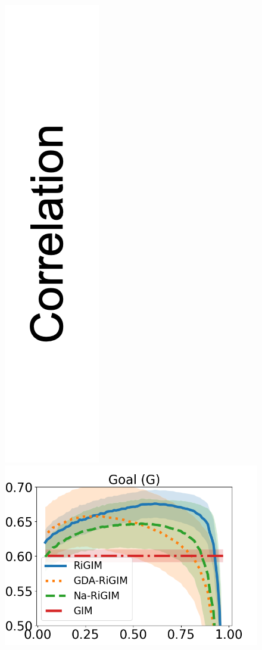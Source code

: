 \documentclass{article}
\begin{document}
\begin{figure}[htbp]
    \begin{minipage}{0.01\textwidth}
    \centering
    \includegraphics[scale=0.12]{figures/correlation_y_label.png}
    \end{minipage}
    \begin{minipage}{0.16\textwidth}
    \centering
    \includegraphics[scale=0.14]{figures/soccer_risk_curve_Goals_shadow.png}\par

\end{minipage}
\end{figure}
\end{document}
